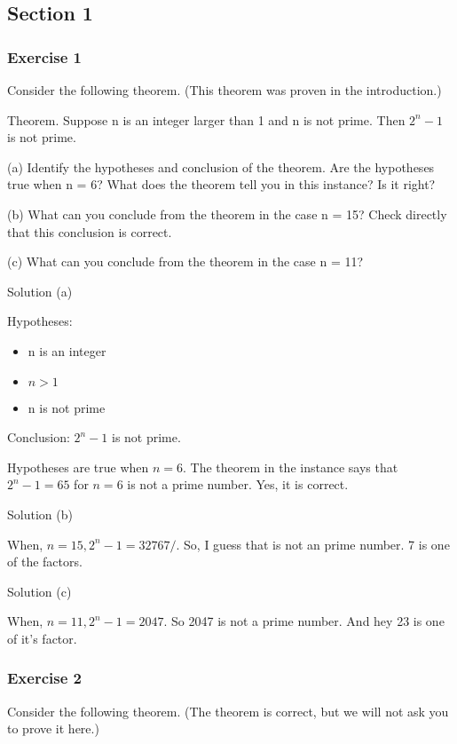 \subsection{Section 1}

\subsubsection{Exercise 1}
Consider the following theorem. (This theorem was proven in the
introduction.)

Theorem. Suppose n is an integer larger than 1 and n is not prime.
Then $2^n - 1$  is not prime.

(a) Identify the hypotheses and conclusion of the theorem. Are the
hypotheses true when n = 6? What does the theorem tell you in this
instance? Is it right?

(b) What can you conclude from the theorem in the case n = 15? Check
directly that this conclusion is correct.

(c) What can you conclude from the theorem in the case n = 11?

Solution (a)

Hypotheses:
\begin{itemize}
\item n is an integer
\item $n > 1$
\item n is not prime
\end{itemize}

Conclusion:
$2^n - 1$ is not prime.

Hypotheses are true when $n = 6$. The theorem in the instance says
that $2^n - 1 = 65$ for $n=6$ is not a prime number. Yes, it is
correct.

Solution (b)

When, $n=15, 2^n - 1 = 32767/$. So, I guess that is not an prime
number. 7 is one of the factors.

Solution (c)

When, $n=11, 2^n - 1 = 2047$. So 2047 is not a prime number. And hey
23 is one of it's factor.
\subsubsection{Exercise 2}
Consider the following theorem. (The theorem is correct, but we will not
ask you to prove it here.)

